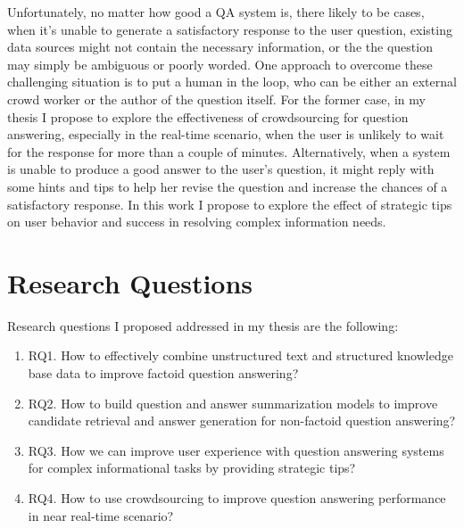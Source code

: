 Unfortunately, no matter how good a QA system is, there likely to be cases, when it's unable to generate a satisfactory response to the user question, \eg existing data sources might not contain the necessary information, or the the question may simply be ambiguous or poorly worded.
One approach to overcome these challenging situation is to put a human in the loop, who can be either an external crowd worker or the author of the question itself.
For the former case, in my thesis I propose to explore the effectiveness of crowdsourcing for question answering, especially in the real-time scenario, when the user is unlikely to wait for the response for more than a couple of minutes.
Alternatively, when a system is unable to produce a good answer to the user's question, it might reply with some hints and tips to help her revise the question and increase the chances of a satisfactory response.
In this work I propose to explore the effect of strategic tips on user behavior and success in resolving complex information needs.


\section{Research Questions}

Research questions I proposed addressed in my thesis are the following:

\begin{enumerate}
\item RQ1. How to effectively combine unstructured text and structured knowledge base data to improve factoid question answering?


\item RQ2. How to build question and answer summarization models to improve candidate retrieval and answer generation for non-factoid question answering?
\item RQ3. How we can improve user experience with question answering systems for complex informational tasks by providing strategic tips?
\item RQ4. How to use crowdsourcing to improve question answering performance in near real-time scenario?
\end{enumerate}


